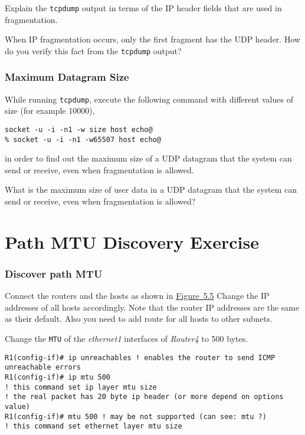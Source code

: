 \documentclass{../UTNetLab}
\begin{document}
    \begin{report}
        \item Explain the \lstinline{tcpdump} output in terms of the IP header fields that are used in fragmentation.

        \item When IP fragmentation occurs, only the first fragment has the UDP header.
    How do you verify this fact from the \lstinline{tcpdump} output?
    \end{report}


\section{Maximum Datagram Size}
\label{sec:MaxDatagramSize}
    While running \lstinline{tcpdump}, execute the following command with different values of size (for example 10000),
    \begin{lstlisting}[emph={size, host},morekeywords={[3]echo}]
socket -u -i -n1 -w size host echo@
% socket -u -i -n1 -w65507 host echo@
    \end{lstlisting}
    in order to find out the maximum size of a UDP datagram that the system can send or receive, even when fragmentation is allowed.

    \begin{report}
        \item What is the maximum size of user data in a UDP datagram that the system can send or receive, even when fragmentation is allowed?
    \end{report}


\part{Path MTU Discovery Exercise}\label{sec:PMTUD}

\section{Discover path MTU}
    Connect the routers and the hosts as shown in \hyperref[fig:5.5]{Figure~5.5} Change the IP addresses of all hosts accordingly.
    Note that the router IP addresses are the same as their default.
    Also you need to add route for all hosts to other subnets.


    Change the \texttt{MTU} of the \textit{ethernet1} interfaces of \textit{Router4} to 500 bytes.
    \begin{lstlisting}[language={cisco}]
R1(config-if)# ip unreachables ! enables the router to send ICMP unreachable errors
R1(config-if)# ip mtu 500
! this command set ip layer mtu size
! the real packet has 20 byte ip header (or more depend on options value)
R1(config-if)# mtu 500 ! may be not supported (can see: mtu ?)
! this command set ethernet layer mtu size
    \end{lstlisting}
\end{document}

